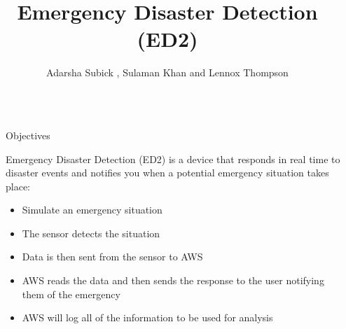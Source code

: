 \documentclass[final]{beamer}
\title{Emergency Disaster Detection (ED2)} %
\author{Adarsha Subick , Sulaman Khan and Lennox Thompson} %
\institute{Capstone} %
\newlength{\sepwid}
\newlength{\onecolwid}
\begin{document}

\setlength{\belowcaptionskip}{2ex} %
\setlength\belowdisplayshortskip{2ex} %

\begin{frame}[t] %

\begin{columns}[t] %

\begin{column}{\sepwid}\end{column} %

\begin{column}{\onecolwid} %


\begin{alertblock}{Objectives}

Emergency Disaster Detection (ED2) is a device that responds in real time to disaster events and notifies you when a potential emergency situation takes place:  
\begin{itemize}
\item  Simulate an emergency situation
\item  The sensor detects the situation
\item Data is then sent from the sensor to AWS
\item AWS reads the data and then sends the response to the user notifying them of the emergency 
\item AWS will log all of the information to be used for analysis 
\end{itemize}

\end{alertblock}



\end{column}
\end{columns}
\end{frame}
\end{document}
